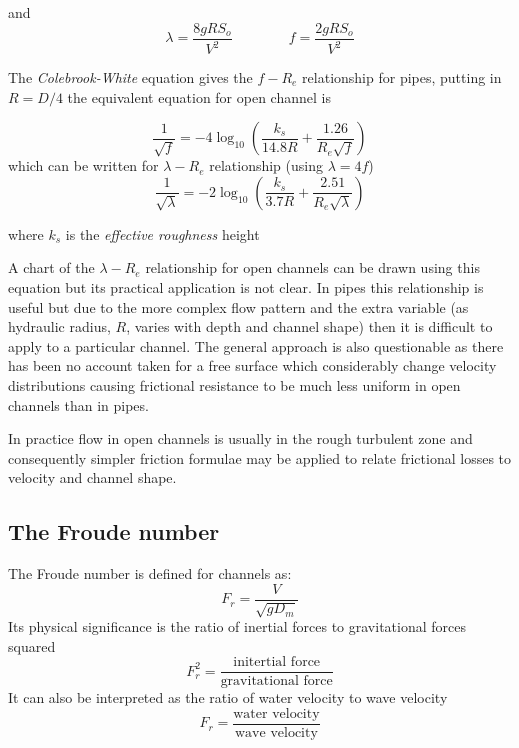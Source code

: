 \documentclass[a4paper, 12pt, british]{article} %
\numberwithin{equation}{section}
\numberwithin{figure}{section}
\numberwithin{table}{section}
\begin{document}
and
\begin{equation}
\lambda = \frac{8gRS_o}{V^2} \qquad \qquad f = \frac{2gRS_o}{V^2}
\end{equation}

  

The \textit{Colebrook-White}  equation gives the $f - R_e$ relationship for pipes, putting in $R=D/4$ the equivalent equation for open channel is

 \begin{equation}
\frac{1}{\sqrt{f}} = -4 \log_{10} \left(\frac{k_s}{14.8 R}+\frac{1.26}{R_e \sqrt{f}}\right)
 \end{equation}
which can be written for $\lambda - R_e$ relationship (using $\lambda = 4f$)
 \begin{equation}
\frac{1}{\sqrt{\lambda}} = -2 \log_{10} \left(\frac{k_s}{3.7 R}+\frac{2.51}{R_e \sqrt{\lambda}}\right)
\end{equation}

where $k_s$ is the \textit{effective roughness} height

A chart of the $\lambda - R_e$ relationship for open channels can be drawn using this equation but its practical application is not clear. In pipes this relationship is useful but due to the more complex flow pattern and the extra variable (as hydraulic radius, $R$, varies with depth and channel shape) then it is difficult to apply to a particular channel. The general approach is also questionable as there has been no account taken for a free surface which considerably change velocity distributions causing frictional resistance to be much less uniform in open channels than in pipes. 

In practice flow in open channels is usually in the rough turbulent zone and consequently simpler friction formulae may be applied to relate frictional losses to velocity and channel shape.

\subsection{The Froude number}
\label{sec:fr}
The Froude number is defined for channels as:
\begin{equation}
F_r = \frac{V}{\sqrt{gD_m}}
\label{eq:fr}
\end{equation} 
Its physical significance is the ratio of inertial forces to gravitational forces squared
\begin{equation*}
F_r^2 = \frac{\text{initertial force}}{\text{gravitational force}}
\label{eq:fr22}
\end{equation*}
It can also be interpreted as the ratio of water velocity to wave velocity
\begin{equation*}
F_r = \frac{\text{water velocity}}{\text{wave velocity}}
\label{eq:fr2}
\end{equation*}
\end{document}
